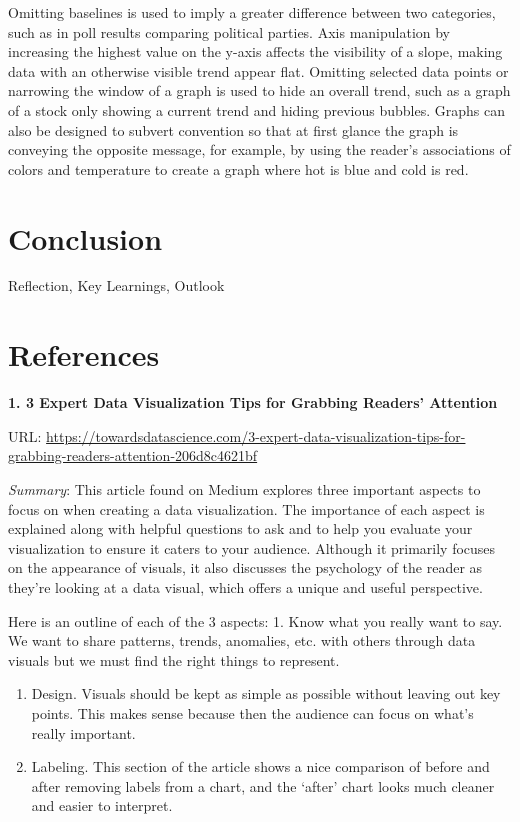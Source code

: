 \documentclass[]{book}
\theoremstyle{definition}
\theoremstyle{definition}
\theoremstyle{definition}
\theoremstyle{remark}
\begin{document}
Omitting baselines is used to imply a greater difference between two
categories, such as in poll results comparing political parties. Axis
manipulation by increasing the highest value on the y-axis affects the
visibility of a slope, making data with an otherwise visible trend
appear flat. Omitting selected data points or narrowing the window of a
graph is used to hide an overall trend, such as a graph of a stock only
showing a current trend and hiding previous bubbles. Graphs can also be
designed to subvert convention so that at first glance the graph is
conveying the opposite message, for example, by using the reader's
associations of colors and temperature to create a graph where hot is
blue and cold is red.

\chapter{Conclusion}\label{conclusion}

Reflection, Key Learnings, Outlook

\chapter*{References}\label{references}

\textbf{1. 3 Expert Data Visualization Tips for Grabbing Readers'
Attention}

URL:
\url{https://towardsdatascience.com/3-expert-data-visualization-tips-for-grabbing-readers-attention-206d8c4621bf}

\emph{Summary}: This article found on Medium explores three important
aspects to focus on when creating a data visualization. The importance
of each aspect is explained along with helpful questions to ask and to
help you evaluate your visualization to ensure it caters to your
audience. Although it primarily focuses on the appearance of visuals, it
also discusses the psychology of the reader as they're looking at a data
visual, which offers a unique and useful perspective.

Here is an outline of each of the 3 aspects: 1. Know what you really
want to say. We want to share patterns, trends, anomalies, etc. with
others through data visuals but we must find the right things to
represent.

\begin{enumerate}
\def\labelenumi{\arabic{enumi}.}
\setcounter{enumi}{1}
\item
  Design. Visuals should be kept as simple as possible without leaving
  out key points. This makes sense because then the audience can focus
  on what's really important.
\item
  Labeling. This section of the article shows a nice comparison of
  before and after removing labels from a chart, and the `after' chart
  looks much cleaner and easier to interpret.
\end{enumerate}
\end{document}
